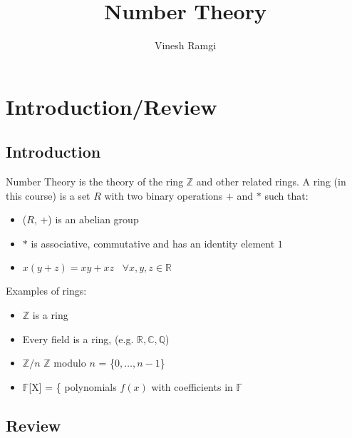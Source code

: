\documentclass[11pt]{article}
\begin{document}
\newtheorem{theorem}{Theorem}[section]
\newtheorem{definition}[theorem]{Defintion}
\newtheorem{proposition}[theorem]{Proposition}
\newtheorem{corollary}[theorem]{Corollary}
\newtheorem{lemma}[theorem]{Lemma}

\title{Number Theory}
\author{Vinesh Ramgi}
\maketitle
\newpage
\tableofcontents{}
\newpage
	\section{Introduction/Review}
	\subsection{Introduction}
	Number Theory is the theory of the ring $\mathbb{Z}$ and other related rings. A ring (in this course) is a set $R$ with two binary operations $+$ and $*$ such that:
	\begin{itemize}
		\item ($R$, $+$) is an abelian group
		\item $*$ is associative, commutative and has an identity element $1$
		\item $x(y+z) = xy + xz \hspace{10pt} \forall x,y,z \in \mathbb{R} $

	\end{itemize}
Examples of rings:
	\begin{itemize}
		\item $\mathbb{Z}$ is a ring
		\item Every field is a ring, (e.g. $\mathbb{R}, \mathbb{C}, \mathbb{Q}$)
		\item $\mathbb{Z}/n$ \hspace{10pt} $\mathbb{Z}$ modulo $n$ = \{$0, \dots, n-1$\}
		\item $\mathbb{F}$[X] = \{ polynomials $f(x)$ with coefficients in $\mathbb{F}$


	\end{itemize}
	\subsection{Review}
\end{document}
